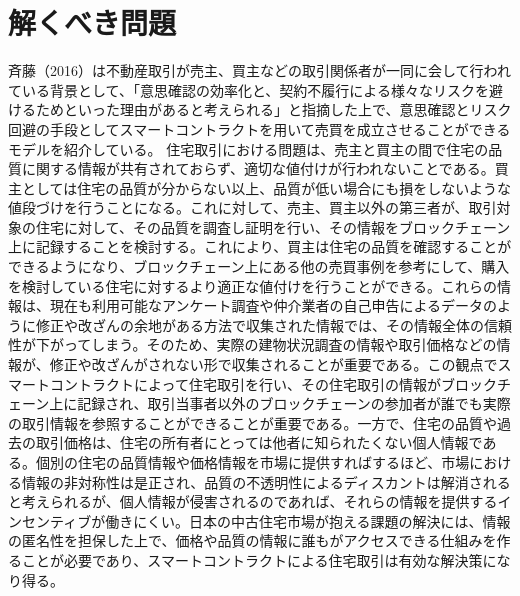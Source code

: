 \documentclass[a4paper,fontsize=11pt,report,notitlepage,line_length=38zw,number_of_lines=40]{jlreq}
\begin{document}
\section{解くべき問題}
斉藤（2016）は不動産取引が売主、買主などの取引関係者が一同に会して行われている背景として、「意思確認の効率化と、契約不履行による様々なリスクを避けるためといった理由があると考えられる」と指摘した上で、意思確認とリスク回避の手段としてスマートコントラクトを用いて売買を成立させることができるモデルを紹介している。
住宅取引における問題は、売主と買主の間で住宅の品質に関する情報が共有されておらず、適切な値付けが行われないことである。買主としては住宅の品質が分からない以上、品質が低い場合にも損をしないような値段づけを行うことになる。これに対して、売主、買主以外の第三者が、取引対象の住宅に対して、その品質を調査し証明を行い、その情報をブロックチェーン上に記録することを検討する。これにより、買主は住宅の品質を確認することができるようになり、ブロックチェーン上にある他の売買事例を参考にして、購入を検討している住宅に対するより適正な値付けを行うことができる。これらの情報は、現在も利用可能なアンケート調査や仲介業者の自己申告によるデータのように修正や改ざんの余地がある方法で収集された情報では、その情報全体の信頼性が下がってしまう。そのため、実際の建物状況調査の情報や取引価格などの情報が、修正や改ざんがされない形で収集されることが重要である。この観点でスマートコントラクトによって住宅取引を行い、その住宅取引の情報がブロックチェーン上に記録され、取引当事者以外のブロックチェーンの参加者が誰でも実際の取引情報を参照することができることが重要である。一方で、住宅の品質や過去の取引価格は、住宅の所有者にとっては他者に知られたくない個人情報である。個別の住宅の品質情報や価格情報を市場に提供すればするほど、市場における情報の非対称性は是正され、品質の不透明性によるディスカントは解消されると考えられるが、個人情報が侵害されるのであれば、それらの情報を提供するインセンティブが働きにくい。日本の中古住宅市場が抱える課題の解決には、情報の匿名性を担保した上で、価格や品質の情報に誰もがアクセスできる仕組みを作ることが必要であり、スマートコントラクトによる住宅取引は有効な解決策になり得る。
\end{document}
